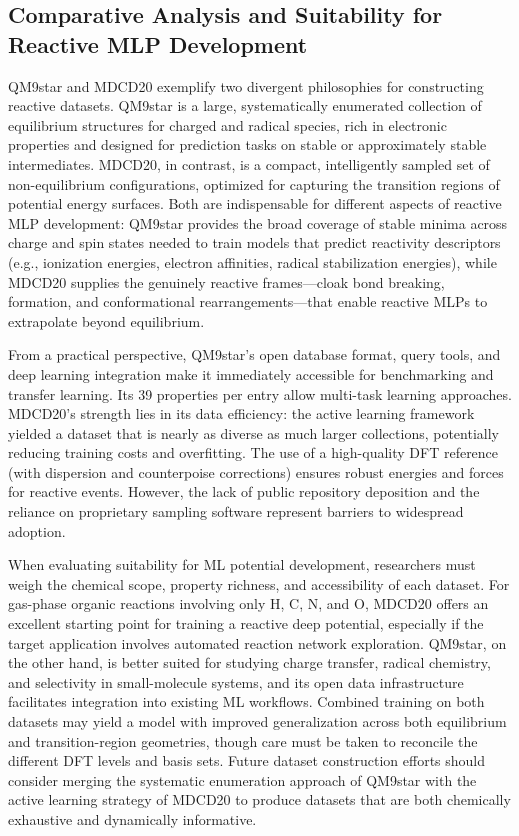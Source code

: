 \documentclass[12pt]{article}
\begin{document}
\subsection{Comparative Analysis and Suitability for Reactive MLP Development}

QM9star and MDCD20 exemplify two divergent philosophies for constructing reactive datasets. QM9star is a large, systematically enumerated collection of equilibrium structures for charged and radical species, rich in electronic properties and designed for prediction tasks on stable or approximately stable intermediates. MDCD20, in contrast, is a compact, intelligently sampled set of non-equilibrium configurations, optimized for capturing the transition regions of potential energy surfaces. Both are indispensable for different aspects of reactive MLP development: QM9star provides the broad coverage of stable minima across charge and spin states needed to train models that predict reactivity descriptors (e.g., ionization energies, electron affinities, radical stabilization energies), while MDCD20 supplies the genuinely reactive frames---cloak bond breaking, formation, and conformational rearrangements---that enable reactive MLPs to extrapolate beyond equilibrium.

From a practical perspective, QM9star's open database format, query tools, and deep learning integration make it immediately accessible for benchmarking and transfer learning. Its 39 properties per entry allow multi-task learning approaches. MDCD20's strength lies in its data efficiency: the active learning framework yielded a dataset that is nearly as diverse as much larger collections, potentially reducing training costs and overfitting. The use of a high-quality DFT reference (with dispersion and counterpoise corrections) ensures robust energies and forces for reactive events. However, the lack of public repository deposition and the reliance on proprietary sampling software represent barriers to widespread adoption.

When evaluating suitability for ML potential development, researchers must weigh the chemical scope, property richness, and accessibility of each dataset. For gas-phase organic reactions involving only H, C, N, and O, MDCD20 offers an excellent starting point for training a reactive deep potential, especially if the target application involves automated reaction network exploration. QM9star, on the other hand, is better suited for studying charge transfer, radical chemistry, and selectivity in small-molecule systems, and its open data infrastructure facilitates integration into existing ML workflows. Combined training on both datasets may yield a model with improved generalization across both equilibrium and transition-region geometries, though care must be taken to reconcile the different DFT levels and basis sets. Future dataset construction efforts should consider merging the systematic enumeration approach of QM9star with the active learning strategy of MDCD20 to produce datasets that are both chemically exhaustive and dynamically informative.
\end{document}
